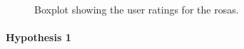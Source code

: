 \documentclass[twocolumn]{svjour3}          %
\begin{document}
% 

% 

% 

\begin{figure}[bt]
 \caption{\label{fig:adapt:rosas}Boxplot showing the user ratings for the \gls{rosas}.}\label{fig:unnamed-chunk-6}
\end{figure}

% 

\hypertarget{competence}{%
\paragraph{Hypothesis 1}\label{competence}}
\end{document}
